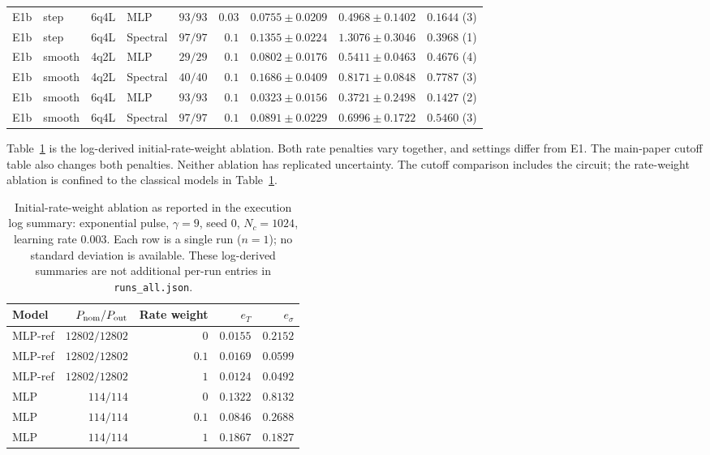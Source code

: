 \documentclass[11pt]{article}
\begin{document}
\begin{longtable}{llllrrrrr}
E1b & step & 6q4L & MLP & $93/93$ & $0.03$ & $0.0755\pm0.0209$ & $0.4968\pm0.1402$ & $0.1644$ (3) \\
E1b & step & 6q4L & Spectral & $97/97$ & $0.1$ & $0.1355\pm0.0224$ & $1.3076\pm0.3046$ & $0.3968$ (1) \\
E1b & smooth & 4q2L & MLP & $29/29$ & $0.1$ & $0.0802\pm0.0176$ & $0.5411\pm0.0463$ & $0.4676$ (4) \\
E1b & smooth & 4q2L & Spectral & $40/40$ & $0.1$ & $0.1686\pm0.0409$ & $0.8171\pm0.0848$ & $0.7787$ (3) \\
E1b & smooth & 6q4L & MLP & $93/93$ & $0.1$ & $0.0323\pm0.0156$ & $0.3721\pm0.2498$ & $0.1427$ (2) \\
E1b & smooth & 6q4L & Spectral & $97/97$ & $0.1$ & $0.0891\pm0.0229$ & $0.6996\pm0.1722$ & $0.5460$ (3) \\
\end{longtable}
\endgroup

Table~\ref{tab:weight-ablation} is the log-derived initial-rate-weight
ablation. Both rate penalties vary together, and settings differ from E1.
The main-paper cutoff table also changes both penalties. Neither ablation
has replicated uncertainty. The cutoff comparison includes the circuit;
the rate-weight ablation is confined to the classical models in
Table~\ref{tab:weight-ablation}.

\begin{table}[htbp]
\centering
\caption{Initial-rate-weight ablation as reported in the execution log summary: exponential pulse, $\gamma=9$, seed $0$, $N_c=1024$, learning rate $0.003$. Each row is a single run ($n=1$); no standard deviation is available. These log-derived summaries are not additional per-run entries in \texttt{runs\_all.json}.}
\label{tab:weight-ablation}
\footnotesize
\setlength{\tabcolsep}{3pt}
\begin{tabular}{lrrrr}
\toprule
Model & $P_{\rm nom}/P_{\rm out}$ & Rate weight & $e_T$ & $e_\sigma$ \\
\midrule
MLP-ref & $12802/12802$ & $0$ & $0.0155$ & $0.2152$ \\
MLP-ref & $12802/12802$ & $0.1$ & $0.0169$ & $0.0599$ \\
MLP-ref & $12802/12802$ & $1$ & $0.0124$ & $0.0492$ \\
MLP & $114/114$ & $0$ & $0.1322$ & $0.8132$ \\
MLP & $114/114$ & $0.1$ & $0.0846$ & $0.2688$ \\
MLP & $114/114$ & $1$ & $0.1867$ & $0.1827$ \\
\bottomrule
\end{tabular}
\end{table}
\end{document}
